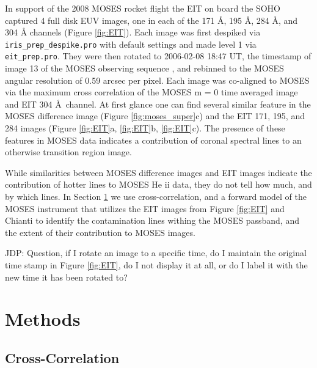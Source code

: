 \documentclass[]{solarphysics}
\newcommand{\jdp}[1]{{\color{blue} JDP: #1}} %
\begin{document}
\begin{article}
	In support of the 2008 MOSES rocket flight the \acl{EIT} \citep[EIT:][]{EIT} on board the \ac{SOHO} captured 4 full disk EUV images, one in each of the 171 {\AA}, 195 {\AA}, 284 {\AA}, and 304 {\AA} channels (Figure \ref{fig:EIT}). Each image was first despiked via \texttt{iris\_prep\_despike.pro} with default settings and made level 1 via \texttt{eit\_prep.pro}. They were then rotated to 2006-02-08 18:47 UT, the timestamp of image 13 of the MOSES observing sequence \citep{Fox2011}, and rebinned to the MOSES angular resolution of 0.59 arcsec per pixel.  Each image was co-aligned to MOSES via the maximum cross correlation of the MOSES m = 0 time averaged image and EIT 304 \AA \ channel. At first glance one can find several similar feature in the \ac{MOSES} difference image (Figure \ref{fig:moses_super}c) and the \ac{EIT} 171, 195, and 284 images (Figure \ref{fig:EIT}a, \ref{fig:EIT}b, \ref{fig:EIT}c).  The presence of these features in \ac{MOSES} data indicates a contribution of coronal spectral lines to an otherwise transition region image.  
	
	While similarities between \ac{MOSES} difference images and \ac{EIT} images indicate the contribution of hotter lines to \ac{MOSES} He {\sc ii} data, they do not tell how much, and by which lines.  In Section \ref{sec:methods} we use cross-correlation, and a forward model of the \ac{MOSES} instrument that utilizes the EIT images from Figure \ref{fig:EIT} and Chianti \citep{Chianti1,Chianti8} to identify the contamination lines withing the MOSES passband, and the extent of their contribution to MOSES images.
	 
	
	 \jdp{Question, if I rotate an image to a specific time, do I maintain the original time stamp in Figure \ref{fig:EIT}, do I not display it at all, or do I label it with the new time it has been rotated to?}
		
	
	

\section{Methods}
\label{sec:methods}
	
 
 	
 	\subsection{Cross-Correlation}
 	\label{sec:crosscorrelation}
 	 

\end{article}
\end{document}
